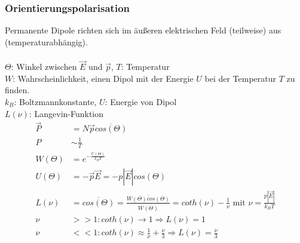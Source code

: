 \documentclass[a4paper,twocolumn,10pt]{article}
\begin{document}
\subsubsection{Orientierungspolarisation}
Permanente Dipole richten sich im äußeren elektrischen Feld (teilweise) aus (temperaturabhängig).\\\\
$\Theta$: Winkel zwischen $\overrightarrow{E}$ und $\overrightarrow{p}$, $T$: Temperatur\\
$W$: Wahrscheinlichkeit, einen Dipol mit der Energie $U$ bei der Temperatur $T$ zu finden.\\
$k_B$: Boltzmannkonstante, $U$: Energie von Dipol\\
$L(\nu)$: Langevin-Funktion
\begin{equation*}
\begin{split}
\overrightarrow{P}&=N\overrightarrow{p}\overline{cos(\Theta)}\\
P&\sim \frac{1}{T}\\
W(\Theta)&= e^{-\frac{U(\Theta)}{k_BT}}\\
U(\Theta)&=-\overrightarrow{p}\overrightarrow{E}=-p|\overrightarrow{E}|cos(\Theta)\\
L(\nu)&=\overline{cos(\Theta)}=\frac{\overline{W(\Theta)cos(\Theta)}}{\overline{W(\Theta)}}=coth(\nu)-\frac{1}{\nu}\text{ mit }\nu=\frac{p|\overrightarrow{E}|}{k_BT}\\
\nu &>>1:coth(\nu)\rightarrow 1\Rightarrow L(\nu)=1\\
\nu &<<1: coth(\nu)\approx\frac{1}{\nu}+\frac{\nu}{3}\Rightarrow L(\nu)=\frac{\nu}{3}
\end{split}
\end{equation*}
\end{document}
